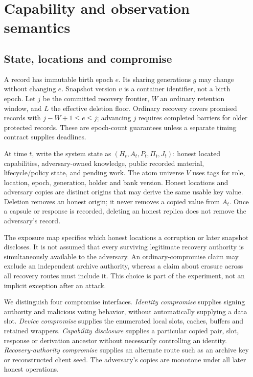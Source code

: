 \documentclass[pdflatex,sn-mathphys-num]{sn-jnl}
\theoremstyle{plain}
\theoremstyle{definition}
\begin{document}
\section{Capability and observation semantics}\label{sec:model}

\subsection{State, locations and compromise}
A record has immutable birth epoch $e$. Its sharing generations $g$ may change without changing $e$. Snapshot version $v$ is a container identifier, not a birth epoch. Let $j$ be the committed recovery frontier, $W$ an ordinary retention window, and $L$ the effective deletion floor. Ordinary recovery covers promised records with $j-W+1\le e\le j$; advancing $j$ requires completed barriers for older protected records. These are epoch-count guarantees unless a separate timing contract supplies deadlines.

At time $t$, write the system state as $(H_t,A_t,P_t,\Pi_t,J_t)$: honest located capabilities, adversary-owned knowledge, public recorded material, lifecycle/policy state, and pending work. The atom universe $V$ uses tags for role, location, epoch, generation, holder and bank version. Honest locations and adversary copies are distinct origins that may derive the same usable key value. Deletion removes an honest origin; it never removes a copied value from $A_t$. Once a capsule or response is recorded, deleting an honest replica does not remove the adversary's record.

The exposure map specifies which honest locations a corruption or later snapshot discloses. It is not assumed that every surviving legitimate recovery authority is simultaneously available to the adversary. An ordinary-compromise claim may exclude an independent archive authority, whereas a claim about erasure across all recovery routes must include it. This choice is part of the experiment, not an implicit exception after an attack.

We distinguish four compromise interfaces. \emph{Identity compromise} supplies signing authority and malicious voting behavior, without automatically supplying a data slot. \emph{Device compromise} supplies the enumerated local slots, caches, buffers and retained wrappers. \emph{Capability disclosure} supplies a particular copied pair, slot, response or derivation ancestor without necessarily controlling an identity. \emph{Recovery-authority compromise} supplies an alternate route such as an archive key or reconstructed client seed. The adversary's copies are monotone under all later honest operations.
\end{document}
